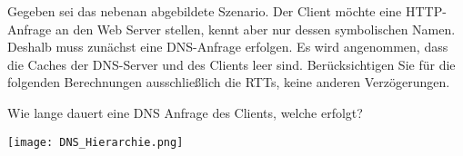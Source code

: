 \question[5]
\begin{minipage}[]{.45\linewidth}
Gegeben sei das nebenan abgebildete Szenario. Der Client möchte eine HTTP-Anfrage
an den Web Server stellen, kennt aber nur dessen symbolischen Namen. Deshalb
muss zunächst eine DNS-Anfrage erfolgen. Es wird angenommen, dass die Caches
der DNS-Server und des Clients leer sind.  Berücksichtigen Sie für die folgenden
Berechnungen ausschließlich die RTTs, keine anderen Verzögerungen.

Wie lange dauert eine DNS Anfrage des Clients, welche  erfolgt?
\end{minipage}
\hfill
\begin{minipage}[]{.45\linewidth}
	\texttt{[image: DNS\_Hierarchie.png]}
\end{minipage}


\begin{solutionbox}{1.5cm}
\end{solutionbox}
